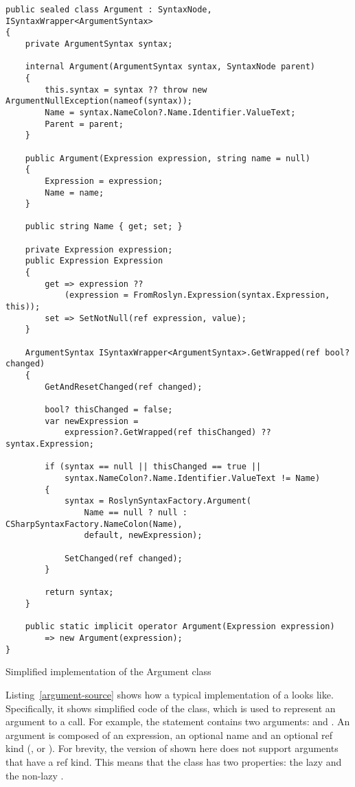 \begin{listing}
\begin{verbatim}
public sealed class Argument : SyntaxNode, ISyntaxWrapper<ArgumentSyntax>
{
    private ArgumentSyntax syntax;

    internal Argument(ArgumentSyntax syntax, SyntaxNode parent)
    {
        this.syntax = syntax ?? throw new ArgumentNullException(nameof(syntax));
        Name = syntax.NameColon?.Name.Identifier.ValueText;
        Parent = parent;
    }

    public Argument(Expression expression, string name = null)
    {
        Expression = expression;
        Name = name;
    }

    public string Name { get; set; }

    private Expression expression;
    public Expression Expression
    {
        get => expression ??
            (expression = FromRoslyn.Expression(syntax.Expression, this));
        set => SetNotNull(ref expression, value);
    }

    ArgumentSyntax ISyntaxWrapper<ArgumentSyntax>.GetWrapped(ref bool? changed)
    {
        GetAndResetChanged(ref changed);
        
        bool? thisChanged = false;
        var newExpression =
            expression?.GetWrapped(ref thisChanged) ?? syntax.Expression;

        if (syntax == null || thisChanged == true ||
            syntax.NameColon?.Name.Identifier.ValueText != Name)
        {
            syntax = RoslynSyntaxFactory.Argument(
                Name == null ? null : CSharpSyntaxFactory.NameColon(Name),
                default, newExpression);

            SetChanged(ref changed);
        }

        return syntax;
    }

    public static implicit operator Argument(Expression expression)
        => new Argument(expression);
}
\end{verbatim}
\caption{Simplified implementation of the Argument class}
\label{argument-source}
\end{listing}

Listing~\ref{argument-source} shows how a typical implementation of a  looks like. Specifically, it shows simplified code of the  class, which is used to represent an argument to a call. For example, the statement  contains two arguments:  and . An argument is composed of an expression, an optional name and an optional ref kind (,  or ). For brevity, the version of  shown here does not support arguments that have a ref kind. This means that the class has two properties: the lazy  and the non-lazy .

